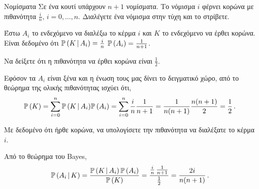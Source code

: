 \documentclass[10pt,greek,solution]{exam-uoc}
\begin{document}
\thispagestyle{empty}




\begin{question}{Νομίσματα}
%
Σε ένα κουτί υπάρχουν $n+1$ νομίσματα.
Το νόμισμα $i$ φέρνει κορώνα με πιθανότητα $\frac{i}{n}, \, i=0,\ldots,n$.
Διαλέγετε ένα νόμισμα στην τύχη και το στρίβετε. 

\begin{solution}
%
Έστω $A_i$ το ενδεχόμενο να διαλέξω το κέρμα $i$ και $K$ το ενδεχόμενο να έρθει κορώνα.
Είναι δεδομένο ότι $\Prob(K \,|\, A_i)=\frac{i}{n}$ $\Prob(A_i) = \frac{1}{n+1}$.
%
\end{solution}


\begin{subquestion}[10]
%
Να δείξετε ότι η πιθανότητα να έρθει κορώνα είναι $\frac{1}{2}$.
%
\end{subquestion}

\begin{solution}
%
Εφόσον τα $A_i$ είναι ξένα και η ένωση τους μας δίνει το δειγματικό χώρο, από το θεώρημα
της ολικής πιθανότητας ισχύει ότι,
%
%
\begin{equation}
    \Prob(K) = \sum_{i=0}^n \Prob(K \,|\, A_i) \Prob(A_i) = 
    \sum_{i=0}^n \frac{i}{n} \frac{1}{n+1} =
    \frac{1}{n(n+1)} \frac{n(n+1)}{2} = \frac{1}{2} \,.
\end{equation}
%
%
\end{solution}

\begin{subquestion}[10]
%
Με δεδομένο ότι ήρθε κορώνα, να υπολογίσετε την πιθανότητα να διαλέξατε το κέρμα $i$.
%
\end{subquestion}

\begin{solution}
%
Από το θεώρημα του \en Bayes\gr,
%
\begin{equation}
    \Prob( A_i \,|\, K) 
    =
    \frac{\Prob(K \,|\, A_i) \, \Prob( A_i ) }{\Prob( K )}
    =
    \frac{\frac{i}{n} \, \frac{1}{n+1}}{\frac{1}{2}}
    =
    \frac{2i}{n(n+1)} \,.
\end{equation}
%

%
\end{solution}

\end{question}
\end{document}
